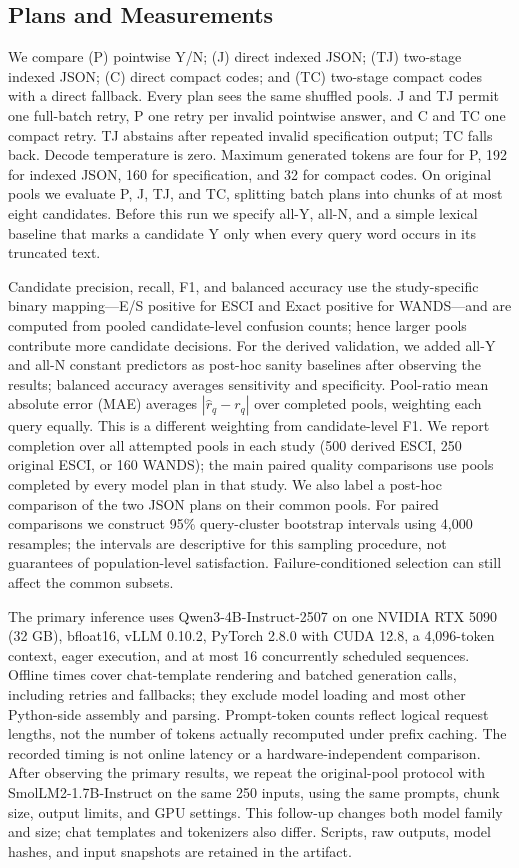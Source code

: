 \documentclass[conference]{IEEEtran}
\begin{document}
\subsection{Plans and Measurements}
We compare (P) pointwise Y/N; (J) direct indexed JSON; (TJ) two-stage indexed JSON; (C) direct compact codes; and (TC) two-stage compact codes with a direct fallback. Every plan sees the same shuffled pools. J and TJ permit one full-batch retry, P one retry per invalid pointwise answer, and C and TC one compact retry. TJ abstains after repeated invalid specification output; TC falls back. Decode temperature is zero. Maximum generated tokens are four for P, 192 for indexed JSON, 160 for specification, and 32 for compact codes. On original pools we evaluate P, J, TJ, and TC, splitting batch plans into chunks of at most eight candidates. Before this run we specify all-Y, all-N, and a simple lexical baseline that marks a candidate Y only when every query word occurs in its truncated text.

Candidate precision, recall, F1, and balanced accuracy use the study-specific binary mapping---E/S positive for ESCI and Exact positive for WANDS---and are computed from pooled candidate-level confusion counts; hence larger pools contribute more candidate decisions. For the derived validation, we added all-Y and all-N constant predictors as post-hoc sanity baselines after observing the results; balanced accuracy averages sensitivity and specificity. Pool-ratio mean absolute error (MAE) averages $|\hat r_q-r_q|$ over completed pools, weighting each query equally. This is a different weighting from candidate-level F1. We report completion over all attempted pools in each study (500 derived ESCI, 250 original ESCI, or 160 WANDS); the main paired quality comparisons use pools completed by every model plan in that study. We also label a post-hoc comparison of the two JSON plans on their common pools. For paired comparisons we construct 95\% query-cluster bootstrap intervals using 4,000 resamples; the intervals are descriptive for this sampling procedure, not guarantees of population-level satisfaction. Failure-conditioned selection can still affect the common subsets.

The primary inference uses Qwen3-4B-Instruct-2507 \cite{qwen} on one NVIDIA RTX 5090 (32 GB), bfloat16, vLLM 0.10.2, PyTorch 2.8.0 with CUDA 12.8, a 4,096-token context, eager execution, and at most 16 concurrently scheduled sequences. Offline times cover chat-template rendering and batched generation calls, including retries and fallbacks; they exclude model loading and most other Python-side assembly and parsing. Prompt-token counts reflect logical request lengths, not the number of tokens actually recomputed under prefix caching. The recorded timing is not online latency or a hardware-independent comparison. After observing the primary results, we repeat the original-pool protocol with SmolLM2-1.7B-Instruct \cite{smollm} on the same 250 inputs, using the same prompts, chunk size, output limits, and GPU settings. This follow-up changes both model family and size; chat templates and tokenizers also differ. Scripts, raw outputs, model hashes, and input snapshots are retained in the artifact.
\end{document}
